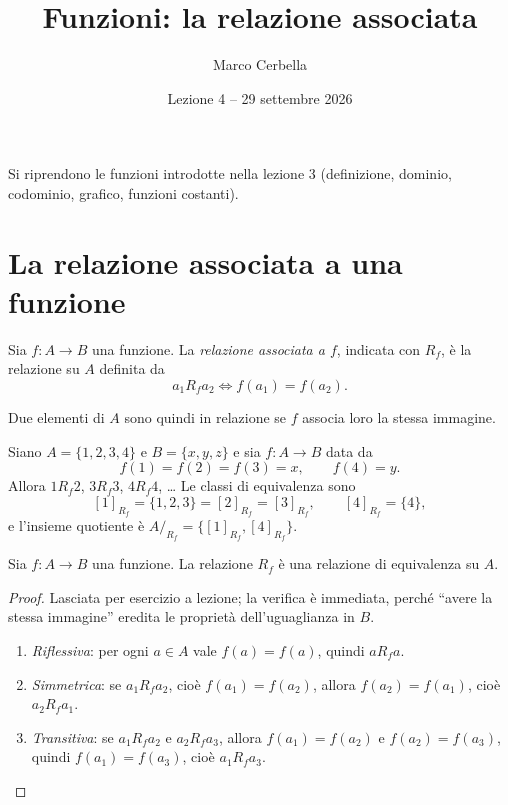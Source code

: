 \documentclass[11pt,a4paper]{article}
\title{Funzioni: la relazione associata}
\author{Marco Cerbella}
\date{Lezione 4 -- 29 settembre 2026}
\begin{document}
\maketitle

Si riprendono le funzioni introdotte nella lezione 3 (definizione, dominio, codominio, grafico, funzioni costanti).

\section{La relazione associata a una funzione}

\begin{definizione}
Sia $f : A \to B$ una funzione. La \emph{relazione associata a $f$}, indicata
con $R_f$, è la relazione su $A$ definita da
\[
a_1 \mathrel{R_f} a_2 \iff f(a_1) = f(a_2).
\]
\end{definizione}

Due elementi di $A$ sono quindi in relazione se $f$ associa loro la stessa
immagine.

\begin{esempio}
Siano $A = \{1, 2, 3, 4\}$ e $B = \{x, y, z\}$ e sia $f : A \to B$ data da
\[
f(1) = f(2) = f(3) = x, \qquad f(4) = y.
\]
Allora $1 \mathrel{R_f} 2$, $3 \mathrel{R_f} 3$, $4 \mathrel{R_f} 4$, \dots{}
Le classi di equivalenza sono
\[
[1]_{R_f} = \{1, 2, 3\} = [2]_{R_f} = [3]_{R_f}, \qquad
[4]_{R_f} = \{4\},
\]
e l'insieme quotiente è $A/_{R_f} = \{[1]_{R_f}, [4]_{R_f}\}$.
\end{esempio}

\begin{teorema}
Sia $f : A \to B$ una funzione. La relazione $R_f$ è una relazione di
equivalenza su $A$.
\end{teorema}

\begin{proof}
Lasciata per esercizio a lezione; la verifica è
immediata, perché ``avere la stessa immagine'' eredita le proprietà
dell'uguaglianza in $B$.
\begin{enumerate}
    \item \emph{Riflessiva}: per ogni $a \in A$ vale $f(a) = f(a)$, quindi
          $a \mathrel{R_f} a$.
    \item \emph{Simmetrica}: se $a_1 \mathrel{R_f} a_2$, cioè
          $f(a_1) = f(a_2)$, allora $f(a_2) = f(a_1)$, cioè
          $a_2 \mathrel{R_f} a_1$.
    \item \emph{Transitiva}: se $a_1 \mathrel{R_f} a_2$ e
          $a_2 \mathrel{R_f} a_3$, allora $f(a_1) = f(a_2)$ e
          $f(a_2) = f(a_3)$, quindi $f(a_1) = f(a_3)$, cioè
          $a_1 \mathrel{R_f} a_3$. \qedhere
\end{enumerate}
\end{proof}
\end{document}
